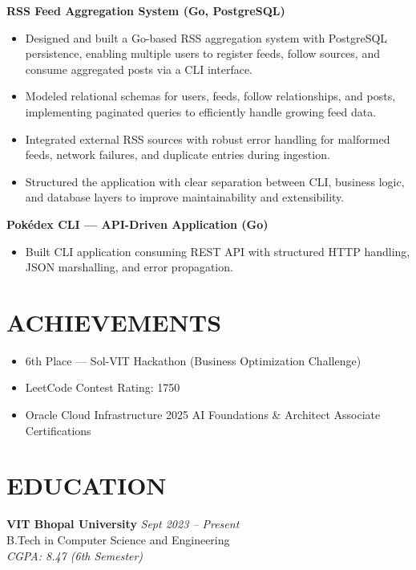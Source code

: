 \documentclass[a4paper,11pt]{article}
\begin{document}
\textbf{RSS Feed Aggregation System (Go, PostgreSQL)}
\begin{itemize}[leftmargin=1em]
    \item Designed and built a Go-based RSS aggregation system with PostgreSQL persistence, enabling multiple users to register feeds, follow sources, and consume aggregated posts via a CLI interface.
    \item Modeled relational schemas for users, feeds, follow relationships, and posts, implementing paginated queries to efficiently handle growing feed data.
    \item Integrated external RSS sources with robust error handling for malformed feeds, network failures, and duplicate entries during ingestion.
    \item Structured the application with clear separation between CLI, business logic, and database layers to improve maintainability and extensibility.
\end{itemize}

\textbf{Pokédex CLI — API-Driven Application (Go)}
\begin{itemize}[leftmargin=1em]
    \item  Built CLI application consuming REST API with structured HTTP handling, JSON marshalling, and error propagation.
   
\end{itemize}
\section*{ACHIEVEMENTS}
\begin{itemize}[leftmargin=1em, itemsep=0pt]
    \item 6th Place — Sol-VIT Hackathon (Business Optimization Challenge) \item LeetCode Contest Rating: 1750
    \item Oracle Cloud Infrastructure 2025 AI Foundations \& Architect Associate Certifications
\end{itemize}


\section*{EDUCATION}
\textbf{VIT Bhopal University} \hfill \textit{Sept 2023 – Present} \\
B.Tech in Computer Science and Engineering \\
\textit{CGPA: 8.47 (6th Semester)}
\end{document}
